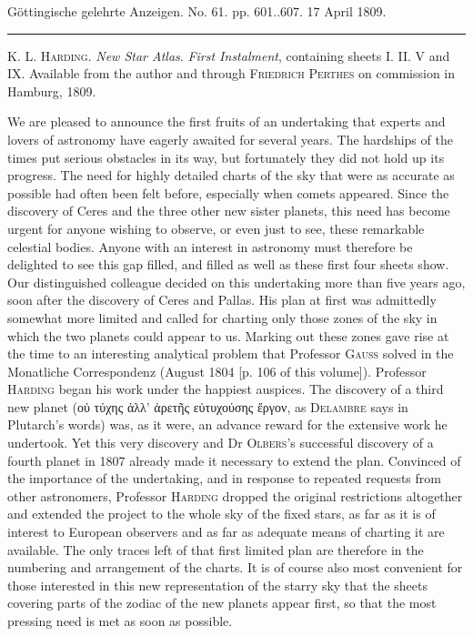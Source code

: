 \clearpage
{}
\begin{center}\small Göttingische gelehrte Anzeigen. No. 61. pp. 601..607. 17 April 1809.\\[3pt]\rule{.72\linewidth}{.3pt}\end{center}

\textsc{K. L. Harding}. \emph{New Star Atlas}. \emph{First Instalment}, containing sheets I. II. V and IX. Available from the author and through \textsc{Friedrich Perthes} on commission in Hamburg, 1809.

We are pleased to announce the first fruits of an undertaking that experts and lovers of astronomy have eagerly awaited for several years. The hardships of the times put serious obstacles in its way, but fortunately they did not hold up its progress. The need for highly detailed charts of the sky that were as accurate as possible had often been felt before, especially when comets appeared. Since the discovery of Ceres and the three other new sister planets, this need has become urgent for anyone wishing to observe, or even just to see, these remarkable celestial bodies. Anyone with an interest in astronomy must therefore be delighted to see this gap filled, and filled as well as these first four sheets show. Our distinguished colleague decided on this undertaking more than five years ago, soon after the discovery of Ceres and Pallas. His plan at first was admittedly somewhat more limited and called for charting only those zones of the sky in which the two planets could appear to us. Marking out these zones gave rise at the time to an interesting analytical problem that Professor \textsc{Gauss} solved in the Monatliche Correspondenz (August 1804 [p. 106 of this volume]). Professor \textsc{Harding} began his work under the happiest auspices. The discovery of a third new planet ({\LatitudeSymbols οὐ τύχης ἀλλ' ἀρετῆς εὐτυχούσης ἔργον}, as \textsc{Delambre} says in Plutarch’s words) was, as it were, an advance reward for the extensive work he undertook. Yet this very discovery and Dr \textsc{Olbers}’s successful discovery of a fourth planet in 1807 already made it necessary to extend the plan. Convinced of the importance of the undertaking, and in response to repeated requests from other astronomers, Professor \textsc{Harding} dropped the original restrictions altogether and extended the project to the whole sky of the fixed stars, as far as it is of interest to European observers and as far as adequate means of charting it are available. The only traces left of that first limited plan are therefore in the numbering and arrangement of the charts. It is of course also most convenient for those interested in this new representation of the starry sky that the sheets covering parts of the zodiac of the new planets appear first, so that the most pressing need is met as soon as possible.

